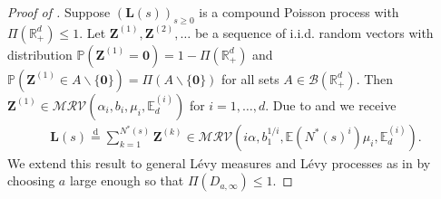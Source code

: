 \documentclass[aos]{imsart}
\numberwithin{equation}{section}
\theoremstyle{plain} %
\theoremstyle{remark}
\newcommand{\E}{\mathbb{E}}
\renewcommand\P{\mathbb{P}}
\newcommand{\R}{\mathbb{R}}
\def\MRV{\mathcal{MRV}}
\def\bzero{\boldsymbol 0}
\def\bZ{\boldsymbol Z}
\def\bL{\boldsymbol L}
\newcommand{\eqd}{\stackrel{\mathrm{d}}{=}}
\begin{document}
\begin{proof}[Proof of ]  Suppose $( \bL(s))_{s\geq 0}$ is a compound Poisson process with $\Pi(\R^d_+)\leq 1$. Let $\bZ^{(1)},\bZ^{(2)},\ldots$ be a sequence of  i.i.d.  random vectors with distribution $\P(\bZ^{(1)}=\bzero)=1-\Pi(\R_+^d)$ and
$\P(\bZ^{(1)}\in A\backslash\{\bzero\})=\Pi(A\backslash\{\bzero\})$
for all sets $A\in \mathcal{B}(\R_+^d)$. Then
$\bZ^{(1)}\in\MRV(\alpha_i,b_i,\mu_i,\E_d^{(i)})$  for $i=1,\ldots,d$. Due to  and  we receive
\begin{eqnarray*}
    \bL(s)\eqd \sum_{k=1}^{N^*(s)}\bZ^{(k)}\in\MRV(i\alpha,b_1^{1/i},\E(N^*(s)^{i})\mu_i,\E_d^{(i)}).
\end{eqnarray*}
We extend this result to general L\'evy measures and L\'evy processes as in  by choosing $a$ large enough so that $\Pi(D_{a,\infty})\leq 1$.
\end{proof}
\end{document}
